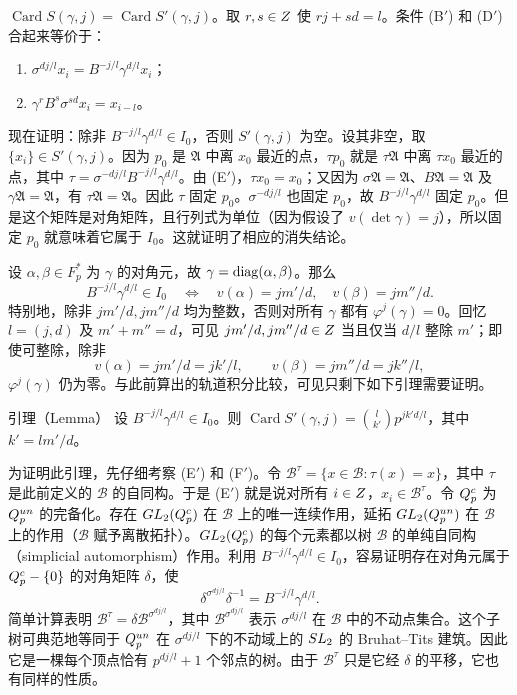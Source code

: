 $\operatorname{Card}S(\gamma,j)=\operatorname{Card}S'(\gamma,j)$。取 $r,s\in Z$ 使 $rj+sd=l$。条件 (B$'$) 和 (D$'$) 合起来等价于：
\begin{enumerate}
\item[(E$'$)] $\sigma^{dj/l}x_i=B^{-j/l}\gamma^{d/l}x_i$；
\item[(F$'$)] $\gamma^rB^s\sigma^{sd}x_i=x_{i-l}$。
\end{enumerate}
现在证明：除非 $B^{-j/l}\gamma^{d/l}\in I_0$，否则 $S'(\gamma,j)$ 为空。设其非空，取 $\{x_i\}\in S'(\gamma,j)$。因为 $p_0$ 是 $\mathfrak A$ 中离 $x_0$ 最近的点，$\tau p_0$ 就是 $\tau\mathfrak A$ 中离 $\tau x_0$ 最近的点，其中
$\tau=\sigma^{-dj/l}B^{-j/l}\gamma^{d/l}$。由 (E$'$)，$\tau x_0=x_0$；又因为
$\sigma\mathfrak A=\mathfrak A$、$B\mathfrak A=\mathfrak A$ 及 $\gamma\mathfrak A=\mathfrak A$，有 $\tau\mathfrak A=\mathfrak A$。因此 $\tau$ 固定 $p_0$。$\sigma^{-dj/l}$ 也固定 $p_0$，故 $B^{-j/l}\gamma^{d/l}$ 固定 $p_0$。但是这个矩阵是对角矩阵，且行列式为单位（因为假设了 $v(\det\gamma)=j$），所以固定 $p_0$ 就意味着它属于 $I_0$。这就证明了相应的消失结论。

设 $\alpha,\beta\in F_p^*$ 为 $\gamma$ 的对角元，故 $\gamma=\operatorname{diag}(\alpha,\beta)$。那么
\[
B^{-j/l}\gamma^{d/l}\in I_0
\quad\Longleftrightarrow\quad
v(\alpha)=jm'/d,\quad v(\beta)=jm''/d.
\]
特别地，除非 $jm'/d,jm''/d$ 均为整数，否则对所有 $\gamma$ 都有 $\varphi^j(\gamma)=0$。回忆 $l=(j,d)$ 及 $m'+m''=d$，可见 $jm'/d,jm''/d\in Z$ 当且仅当 $d/l$ 整除 $m'$；即使可整除，除非
\[
v(\alpha)=jm'/d=jk'/l,\qquad v(\beta)=jm''/d=jk''/l,
\]
$\varphi^j(\gamma)$ 仍为零。与此前算出的轨道积分比较，可见只剩下如下引理需要证明。

\begin{originaltheorem}{引理（Lemma）}
设 $B^{-j/l}\gamma^{d/l}\in I_0$。则
$\operatorname{Card}S'(\gamma,j)=\binom l{k'}p^{jk'd/l}$，其中 $k'=lm'/d$。
\end{originaltheorem}

为证明此引理，先仔细考察 (E$'$) 和 (F$'$)。令
$\mathcal B^\tau=\{x\in\mathcal B:\tau(x)=x\}$，其中 $\tau$ 是此前定义的 $\mathcal B$ 的自同构。于是 (E$'$) 就是说对所有 $i\in Z$，$x_i\in\mathcal B^\tau$。令 $Q_p^c$ 为 $Q_p^{un}$ 的完备化。存在 $GL_2(Q_p^c)$ 在 $\mathcal B$ 上的唯一连续作用，延拓 $GL_2(Q_p^{un})$ 在 $\mathcal B$ 上的作用（$\mathcal B$ 赋予离散拓扑）。$GL_2(Q_p^c)$ 的每个元素都以树 $\mathcal B$ 的单纯自同构（simplicial automorphism）作用。利用 $B^{-j/l}\gamma^{d/l}\in I_0$，容易证明存在对角元属于 $Q_p^c-\{0\}$ 的对角矩阵 $\delta$，使
\[
\delta^{\sigma^{dj/l}}\delta^{-1}=B^{-j/l}\gamma^{d/l}.
\]
简单计算表明
$\mathcal B^\tau=\delta\mathcal B^{\sigma^{dj/l}}$，其中
$\mathcal B^{\sigma^{dj/l}}$ 表示 $\sigma^{dj/l}$ 在 $\mathcal B$ 中的不动点集合。这个子树可典范地等同于 $Q_p^{un}$ 在 $\sigma^{dj/l}$ 下的不动域上的 $SL_2$ 的 Bruhat--Tits 建筑。因此它是一棵每个顶点恰有 $p^{dj/l}+1$ 个邻点的树。由于 $\mathcal B^\tau$ 只是它经 $\delta$ 的平移，它也有同样的性质。

